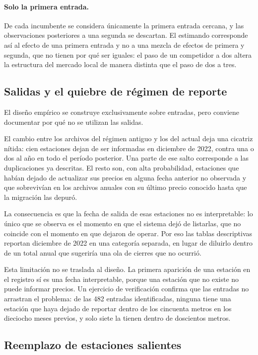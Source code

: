 \paragraph{Solo la primera entrada.} De cada incumbente se considera únicamente
la primera entrada cercana, y las observaciones posteriores a una segunda se
descartan. El estimando corresponde así al efecto de una primera entrada y no a
una mezcla de efectos de primera y segunda, que no tienen por qué ser iguales:
el paso de un competidor a dos altera la estructura del mercado local de manera
distinta que el paso de dos a tres.

\subsection{Salidas y el quiebre de régimen de reporte}

El diseño empírico se construye exclusivamente sobre entradas, pero conviene
documentar por qué no se utilizan las salidas.

El cambio entre los archivos del régimen antiguo y los del actual deja una
cicatriz nítida: cien estaciones dejan de ser informadas en diciembre de 2022,
contra una o dos al año en todo el período posterior. Una parte de ese salto
corresponde a las duplicaciones ya descritas. El resto son, con alta
probabilidad, estaciones que habían dejado de actualizar sus precios en alguna
fecha anterior no observada y que sobrevivían en los archivos anuales con su
último precio conocido hasta que la migración las depuró.

La consecuencia es que la fecha de salida de esas estaciones no es
interpretable: lo único que se observa es el momento en que el sistema dejó de
listarlas, que no coincide con el momento en que dejaron de operar. Por eso las
tablas descriptivas reportan diciembre de 2022 en una categoría separada, en
lugar de diluirlo dentro de un total anual que sugeriría una ola de cierres que
no ocurrió.

Esta limitación no se traslada al diseño. La primera aparición de una estación
en el registro sí es una fecha interpretable, porque una estación que no existe
no puede informar precios. Un ejercicio de verificación confirma que las
entradas no arrastran el problema: de las 482 entradas identificadas, ninguna
tiene una estación que haya dejado de reportar dentro de los cincuenta metros
en los dieciocho meses previos, y solo siete la tienen dentro de doscientos
metros.

\subsection{Reemplazo de estaciones salientes}

